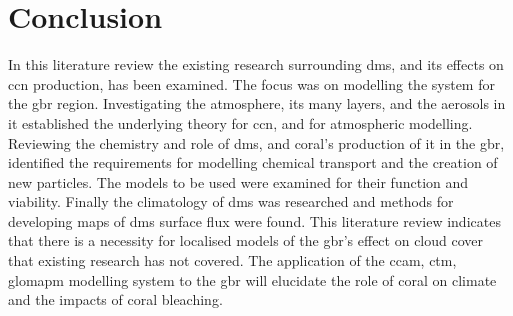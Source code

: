


\section{Conclusion}
\label{sec:conc}

In this literature review the existing research surrounding \gls{dms}, and its effects on \gls{ccn} production, has been examined. The focus was on modelling the system for the \gls{gbr} region. Investigating the atmosphere, its many layers, and the aerosols in it established the underlying theory for \gls{ccn}, and for atmospheric modelling. Reviewing the chemistry and role of \gls{dms}, and coral's production of it in the \gls{gbr}, identified the requirements for modelling chemical transport and the creation of new particles. The models to be used were examined for their function and viability. Finally the climatology of \gls{dms} was researched and methods for developing maps of \gls{dms} surface flux were found. This literature review indicates that there is a necessity for localised models of the \gls{gbr}'s effect on cloud cover that existing research has not covered. The application of the \gls{ccam}, \gls{ctm}, \gls{glomapm} modelling system to the \gls{gbr} will elucidate the role of coral on climate and the impacts of coral bleaching.



		

	




	

